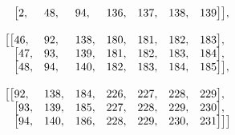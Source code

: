 \begin{itemize}
\[\begin{array}{lllllll}
        \mbox{\hspace{1.5cm}} \big[ 2, & 48, & 94, & 136, & 137, & 138, & 139 \big] \big], \\ \\
        \mbox{\hspace{1.1cm} \big[} \big[ 46, & 92, & 138, & 180, & 181, & 182, & 183 \big], \\  
        \mbox{\hspace{1.5cm}}\big[ 47, & 93, & 139, & 181, & 182, & 183, & 184 \big], \\
        \mbox{\hspace{1.5cm}} \big[ 48, & 94, & 140, & 182, & 183, & 184, & 185 \big] \big], \\ \\
        \mbox{\hspace{1.1cm} \big[} \big[ 92, & 138, & 184, & 226, & 227, & 228, & 229 \big], \\  
        \mbox{\hspace{1.5cm}} \big[ 93, & 139, & 185, & 227, & 228, & 229, & 230 \big], \\
        \mbox{\hspace{1.5cm}} \big[ 94, & 140, & 186, & 228, & 229, & 230, & 231 \big] \big] \big]  \end{array} \]
\end{itemize}

